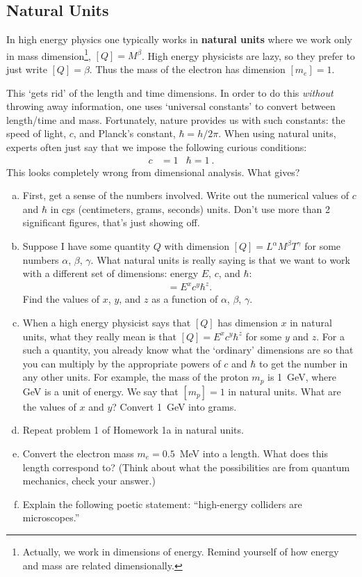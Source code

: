 \documentclass[12pt]{article}
\numberwithin{equation}{subsection}    %
\begin{document}
\subsection{Natural Units}

In high energy physics one typically works in \textbf{natural units} where we work only in mass dimension\footnote{Actually, we work in dimensions of energy. Remind yourself of how energy and mass are related dimensionally.}, $[Q] = M^\beta$. High energy physicists are lazy, so they prefer to just write $[Q]=\beta$. Thus the mass of the electron has dimension $[m_e] = 1$. 

This `gets rid' of the length and time dimensions. In order to do this \emph{without} throwing away information, one uses `universal constants' to convert between length/time and mass. Fortunately, nature provides us with such constants: the speed of light, $c$, and Planck's constant, $\hbar = h/2\pi$. When using natural units, experts often just say that we impose the following curious conditions:
\begin{align}
	c &= 1 
	&
	\hbar = 1 \ .
\end{align}
This looks completely wrong from dimensional analysis. What gives?

\begin{enumerate}[(a)]
	\item First, get a sense of the numbers involved. Write out the numerical values of $c$ and $\hbar$ in cgs (centimeters, grams, seconds) units. Don't use more than 2 significant figures, that's just showing off. 
	\item Suppose I have some quantity $Q$ with dimension $[Q] = L^\alpha M^\beta T^\gamma$ for some numbers $\alpha$, $\beta$, $\gamma$. What natural units is really saying is that we want to work with a different set of dimensions: energy $E$, $c$, and $\hbar$:
		\begin{align*}
			[Q] = E^x c^y \hbar^z .
		\end{align*}
		Find the values of $x$, $y$, and $z$ as a function of $\alpha$, $\beta$, $\gamma$.
	\item When a high energy physicist says that $[Q]$ has dimension $x$ in natural units, what they really mean is that $[Q] = E^x c^y \hbar^z$ for some $y$ and $z$. For a such a quantity, you already know what the `ordinary' dimensions are so that you can multiply by the appropriate powers of $c$ and $\hbar$ to get the number in any other units. For example, the mass of the proton $m_p$ is 1~GeV, where GeV is a unit of energy. We say that $[m_p] = 1$ in natural units. What are the values of $x$ and $y$? Convert 1~GeV into grams.
	\item Repeat problem 1 of Homework 1a in natural units.
	\item Convert the electron mass $m_e = 0.5$~MeV into a length. What does this length correspond to? (Think about what the possibilities are from quantum mechanics, check your answer.)
	\item Explain the following poetic statement: ``high-energy colliders are microscopes.''
\end{enumerate}
\end{document}
